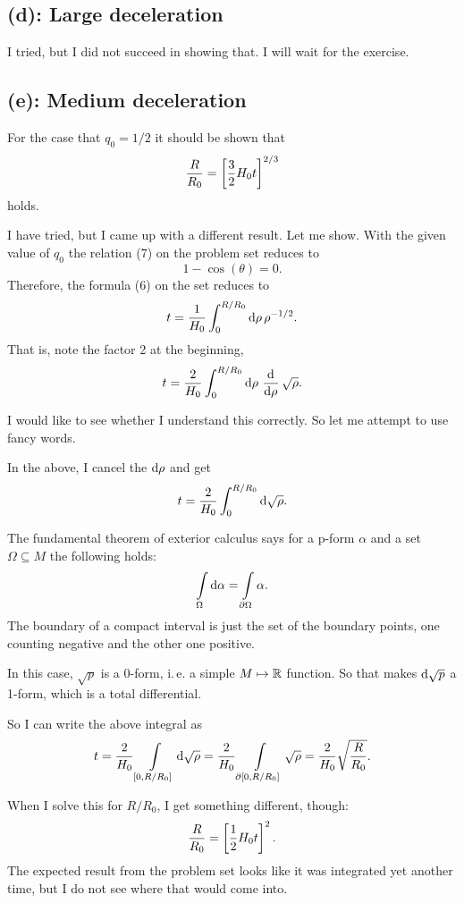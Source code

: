 \subsection*{(d): Large deceleration}

I tried, but I did not succeed in showing that. I will wait for the exercise.

\subsection*{(e): Medium deceleration}

For the case that $q_0 = 1/2$ it should be shown that
\[
    \frac{R}{R_0} = \sbr{\frac 32 H_0 t}^{2/3}
\]
holds.

I have tried, but I came up with a different result. Let me show. With the
given value of $q_0$ the relation (7) on the problem set reduces to
\[
    1 - \cos(\theta) = 0.
\]
Therefore, the formula (6) on the set reduces to
\[
    t = \frac{1}{H_0} \int_0^{R/R_0} \dif \rho \, \rho^{-1/2}.
\]
That is, note the factor 2 at the beginning,
\[
    t = \frac{2}{H_0} \int_0^{R/R_0} \dif \rho \, \dod{}\rho \sqrt\rho.
\]

\begin{aside}
    I would like to see whether I understand this correctly. So let me attempt
    to use fancy words.
\end{aside}

In the above, I cancel the $\dif \rho$ and get
\[
    t = \frac{2}{H_0} \int_0^{R/R_0} \dif \sqrt\rho.
\]

The fundamental theorem of exterior calculus says for a p-form $\alpha$ and a
set $\Omega \subseteq M$ the following holds:
\[
    \intop_\Omega \dif \alpha = \intop_{\partial \Omega} \alpha.
\]
The boundary of a compact interval is just the set of the boundary points, one
counting negative and the other one positive.

In this case, $\sqrt p$ is a 0-form, i.\,e. a simple $M \mapsto \mathbb R$ function. So
that makes $\dif\sqrt p$ a 1-form, which is a total differential.

So I can write the above integral as
\[
    t = \frac{2}{H_0} \intop_{[0, {R}/{R_0}]} \dif \sqrt\rho
    = \frac{2}{H_0} \intop_{\partial [0, {R}/{R_0}]} \sqrt\rho
    = \frac{2}{H_0} \sqrt{\frac{R}{R_0}}.
\]

When I solve this for $R/R_0$, I get something different, though:
\[
    \frac{R}{R_0} = \sbr{\frac 12 H_0t}^2.
\]
The expected result from the problem set looks like it was integrated yet
another time, but I do not see where that would come into.

